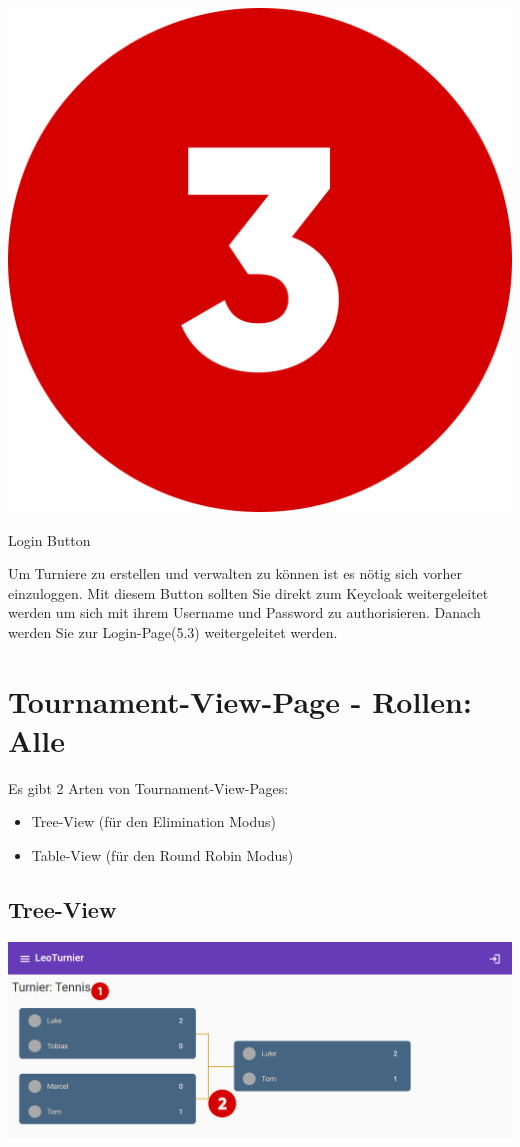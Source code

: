 \newpage
\includegraphics[scale=0.05]{pics/user-guide/numbers/number-3.png} \begin{LARGE} Login Button \end{LARGE}

Um Turniere zu erstellen und verwalten zu können ist es nötig sich vorher einzuloggen. Mit diesem Button sollten Sie direkt zum Keycloak weitergeleitet werden um sich mit ihrem Username und Password zu authorisieren.
Danach werden Sie zur Login-Page(5.3) weitergeleitet werden.

\newpage
\section{Tournament-View-Page - Rollen: Alle}

Es gibt 2 Arten von Tournament-View-Pages:
\begin{itemize}
    \item Tree-View (für den Elimination Modus)
    \item Table-View (für den Round Robin Modus)
\end{itemize}

\subsection{Tree-View}
\includegraphics[scale=0.4]{pics/user-guide/tree-view.png}
\bigskip

